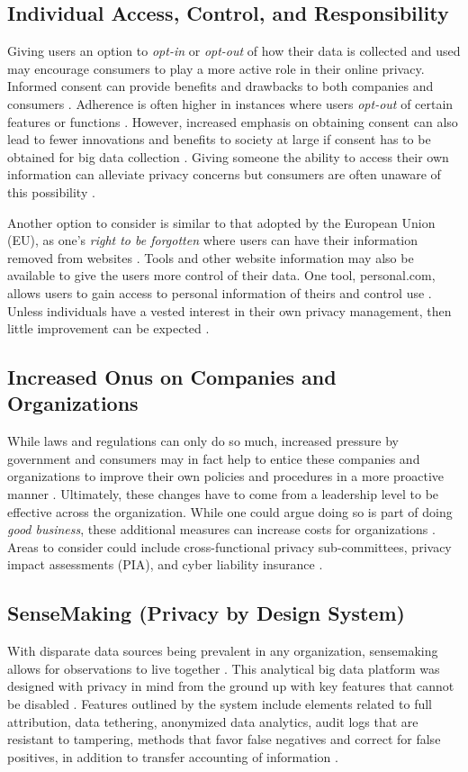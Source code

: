 \documentclass[sigconf]{acmart}
\begin{document}
\subsection{Individual Access, Control, and Responsibility} Giving users an option to \textit{opt-in} or \textit{opt-out} of how their data is collected and used may encourage consumers to play a more active role in their online privacy. Informed consent can provide benefits and drawbacks to both companies and consumers \cite{Tene2012}. Adherence is often higher in instances where users \textit{opt-out} of certain features or functions \cite{Tene2013}. However, increased emphasis on obtaining consent can also lead to fewer innovations and benefits to society at large if consent has to be obtained for big data collection \cite{Tene2013}. Giving someone the ability to access their own information can alleviate privacy concerns but consumers are often unaware of this possibility \cite{Tene2012}.\par Another option to consider is similar to that adopted by the European Union (EU), as one's \textit{right to be forgotten} where users can have their information removed from websites \cite{Francis2014}. Tools and other website information may also be available to give the users more control of their data. One tool, personal.com, allows users to gain access to personal information of theirs and control use \cite{Tene2013}. Unless individuals have a vested interest in their own privacy management, then little improvement can be expected \cite{Tene2012}. 
\subsection{Increased Onus on Companies and Organizations} While laws and regulations can only do so much, increased pressure by government and consumers may in fact help to entice these companies and organizations to improve their own policies and procedures in a more proactive manner \cite{Culnan2009}. Ultimately, these changes have to come from a leadership level to be effective across the organization. While one could argue doing so is part of doing \textit{good business}, these additional measures can increase costs for organizations \cite{Culnan2009}. Areas to consider could include cross-functional privacy sub-committees, privacy impact assessments (PIA), and cyber liability insurance \cite{Culnan2009}. 
\subsection{SenseMaking (Privacy by Design System)} With disparate data sources being prevalent in any organization, sensemaking allows for observations to live together \cite{Cavoukian2012}. This analytical big data platform was designed with privacy in mind from the ground up with key features that cannot be disabled \cite{Cavoukian2012}. Features outlined by the system include elements related to full attribution, data tethering, anonymized data analytics, audit logs that are resistant to tampering, methods that favor false negatives and correct for false positives, in addition to transfer accounting of information \cite{Cavoukian2012}. 
\end{document}
